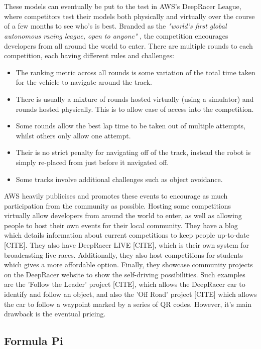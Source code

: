 \documentclass{l4proj}
\begin{document}
\\\\
These models can eventually be put to the test in AWS's DeepRacer League, where competitors test their models both physically and virtually over the course of a few months to see who’s is best. Branded as the \textit{"world's first global autonomous racing league, open to anyone"} \citep{League}, the competition encourages developers from all around the world to enter. There are multiple rounds to each competition, each having different rules and challenges:
\begin{itemize}
    \item The ranking metric across all rounds is some variation of the total time taken for the vehicle to navigate around the track.
    \item There is usually a mixture of rounds hosted virtually (using a simulator) and rounds hosted physically. This is to allow ease of access into the competition.
    \item Some rounds allow the best lap time to be taken out of multiple attempts, whilst others only allow one attempt.
    \item Their is no strict penalty for navigating off of the track, instead the robot is simply re-placed from just before it navigated off.
    \item Some tracks involve additional challenges such as object avoidance.
\end{itemize}
AWS heavily publicises and promotes these events to encourage as much participation from the community as possible. Hosting some competitions virtually allow developers from around the world to enter, as well as allowing people to host their own events for their local community. They have a blog which details information about current competitions to keep people up-to-date [CITE]. They also have DeepRacer LIVE [CITE], which is their own system for broadcasting live races. Additionally, they also host competitions for students which gives a more affordable option. Finally, they showcase community projects on the DeepRacer website to show the self-driving possibilities. Such examples are the 'Follow the Leader' project [CITE], which allows the DeepRacer car to identify and follow an object, and also the 'Off Road' project [CITE] which allows the car to follow a waypoint marked by a series of QR codes. However, it's main drawback is the eventual pricing.

\subsection{Formula Pi}
\end{document}

